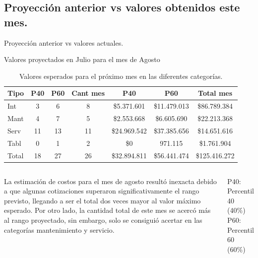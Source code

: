 \documentclass[aspectratio=169,xcolor=dvipsnames]{beamer}
\begin{document}
\subsection{Proyección anterior vs valores obtenidos este mes.}
 \begin{frame}{Proyección anterior vs valores actuales.}

Valores proyectados en Julio para el mes de Agosto  
\begin{table}[h!]
    \centering
         \begin{tabular}{|l||c|c|c||c|c|c|}  \hline
          \rowcolor{MediumBlue} \color{white}Tipo &\color{white}P40&\color{white}P60& \color{white}Cant mes  &\color{white}P40&\color{white}P60&\color{white}Total mes \\ \hline
          Int& 3 & 6 &8 &\$5.371.601&\$11.479.013&\$86.789.384 \\
          Mant&4&7&5 & \$2.553.668&\$6.605.690&\$22.213.368\\
          Serv&11&13&11 &\$24.969.542&\$37.385.656&\$14.651.616\\
          Tabl &0&1&2 &\$0&971.115&\$1.761.904\\ \hline
          Total &18&27& \cellcolor{Green}26 &\$32.894.811 &\$56.441.474 & \cellcolor{Red}\$125.416.272 \\ \hline           
     \end{tabular}
    \caption{Valores esperados para el próximo mes en las diferentes categorías.}
    \label{valores_esperados}
\end{table}
 
 \begin{columns}[c]
 

\begin{block}{}
   \scriptsize{La estimación de costos para el mes de agosto resultó inexacta debido a que algunas cotizaciones superaron significativamente el rango previsto, llegando a ser el total dos veces mayor al valor máximo esperado. Por otro lado, la cantidad total de este mes se acercó más al rango proyectado, sin embargo, solo se consiguió acertar en las categorías mantenimiento y servicio.} 
\end{block}
 \begin{block}{}
   \scriptsize{P40: Percentil 40 (40\%)\\
   P60: Percentil 60 (60\%)}
 \end{block}
 \end{columns}
\end{frame}
\end{document}
